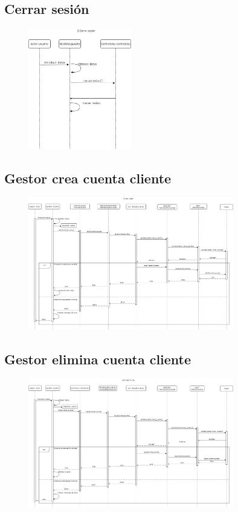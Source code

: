 \documentclass[12pt]{article}
\begin{document}
\subsection{Cerrar sesión}
\begin{figure}[H]
    \centering
    \includegraphics[width=0.4\textwidth]{images/2-Cerrar_sesion.png}
\end{figure}
\subsection{Gestor crea cuenta cliente}
\begin{figure}[H]
    \centering
    \includegraphics[width=0.8\textwidth]{images/crear_cuenta.png}
\end{figure}
\subsection{Gestor elimina cuenta cliente}
\begin{figure}[H]
    \centering
    \includegraphics[width=0.8\textwidth]{images/eliminar_cuenta.png}
\end{figure}
\end{document}
